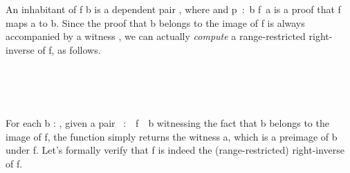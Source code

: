 An inhabitant of  \ab f  \ab b is a dependent pair ,
where  and \ab p~\as :~\ab b  \ab f~\ab a is a proof that
\ab f maps \ab a to \ab b.  Since the proof that \ab b
belongs to the image of \ab f is always accompanied by a witness , we can
actually \emph{compute} a range-restricted right-inverse of \ab f, as follows.

\begin{code}%
\>[0]\<%
\\
\>[0][@{}l@{\AgdaIndent{1}}]%
\>[1]\AgdaSpace{}%
\AgdaSymbol{:}\AgdaSpace{}%
\AgdaSymbol{(}\AgdaSpace{}%
\AgdaSymbol{:}\AgdaSpace{}%
\AgdaSpace{}%
\AgdaSpace{}%
\AgdaSymbol{)\{}\AgdaSpace{}%
\AgdaSymbol{:}\AgdaSpace{}%
\AgdaSymbol{\}}\AgdaSpace{}%
\AgdaSpace{}%
\AgdaSpace{}%
\AgdaSpace{}%
\AgdaSpace{}%
\AgdaSpace{}%
\AgdaSpace{}%
\AgdaSpace{}%
\<%
\\
%
\>[1]\AgdaSpace{}%
\AgdaSymbol{\AgdaUnderscore{}}\AgdaSpace{}%
\AgdaSymbol{(}\AgdaSpace{}%
\AgdaSpace{}%
\AgdaSymbol{\AgdaUnderscore{})}\AgdaSpace{}%
\AgdaSymbol{=}\AgdaSpace{}%
\<%
\\
\>[0]\<%
\end{code}
For each \ab b : , given a pair ~\as :~~\ab f~~\ab b witnessing the fact that \ab b belongs to the image of \ab f, the function  simply returns the witness \ab a, which is a preimage of \ab b under \ab f.
Let's formally verify that  \ab f is indeed the (range-restricted) right-inverse of \ab f.


\begin{code}%
\>[0]\<%
\\
\>[0][@{}l@{\AgdaIndent{1}}]%
\>[1]\AgdaSpace{}%
\AgdaSymbol{:}\AgdaSpace{}%
\AgdaSymbol{\{}\AgdaSpace{}%
\AgdaSymbol{:}\AgdaSpace{}%
\AgdaSpace{}%
\AgdaSpace{}%
\AgdaSymbol{\}\{}\AgdaSpace{}%
\AgdaSymbol{:}\AgdaSpace{}%
\AgdaSymbol{\}(}\AgdaSpace{}%
\AgdaSymbol{:}\AgdaSpace{}%
\AgdaSpace{}%
\AgdaSpace{}%
\AgdaSpace{}%
\AgdaSymbol{)}\AgdaSpace{}%
\AgdaSpace{}%
\AgdaSpace{}%
\AgdaSpace{}%
\AgdaSymbol{(}\AgdaSpace{}%
\AgdaSpace{}%
\AgdaSymbol{)}\AgdaSpace{}%
\AgdaSpace{}%
\<%
\\
%
\>[1]\AgdaSpace{}%
\AgdaSymbol{(}\AgdaSpace{}%
\AgdaSymbol{\AgdaUnderscore{}}\AgdaSpace{}%
\AgdaSymbol{)}\AgdaSpace{}%
\AgdaSymbol{=}\AgdaSpace{}%
\AgdaSpace{}%
\<%
\end{code}


